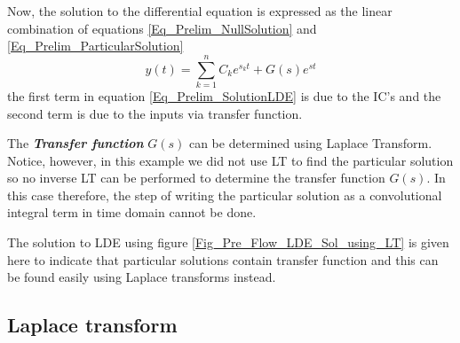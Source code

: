 Now, the solution to the differential equation is expressed as the linear combination of equations \eqref{Eq_Prelim_NullSolution} and \eqref{Eq_Prelim_ParticularSolution}
\begin{equation} \label{Eq_Prelim_SolutionLDE}
	y(t) = \sum_{k = 1}^{n} C_{k} e^{s_{k}t} + G(s)e^{st}
\end{equation}
the first term in equation \eqref{Eq_Prelim_SolutionLDE} is due to the IC's and the second term is due to the inputs via transfer function.

The \textbf{\textit{Transfer function}} $G(s)$ can be determined using Laplace Transform. Notice, however, in this example we did not use LT to find the particular solution so no inverse LT can be performed to determine the transfer function $G(s)$. In this case therefore, the step of writing the particular solution as a convolutional integral term in time domain cannot be done. 

The solution to LDE using figure \ref{Fig_Pre_Flow_LDE_Sol_using_LT} is given here to indicate that particular solutions contain transfer function and this can be found easily using Laplace transforms instead.

\subsection{Laplace transform}

